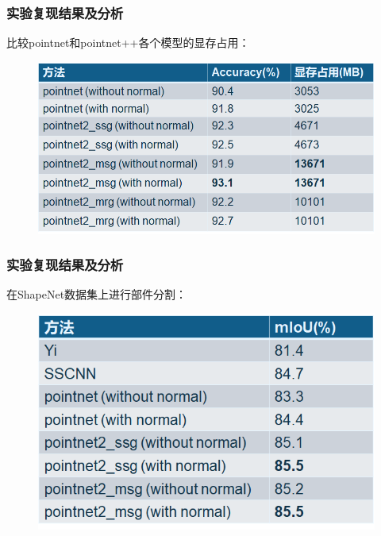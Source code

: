 \begin{frame}
  \frametitle{实验复现结果及分析}

比较pointnet和pointnet++各个模型的显存占用：

\begin{figure}
\includegraphics[scale=0.35]{doc/img/t2.png}
\end{figure}



\end{frame}



\begin{frame}
  \frametitle{实验复现结果及分析}

在ShapeNet数据集上进行部件分割：

\begin{figure}
\includegraphics[scale=0.35]{doc/img/t3.png}
\end{figure}


\end{frame}

